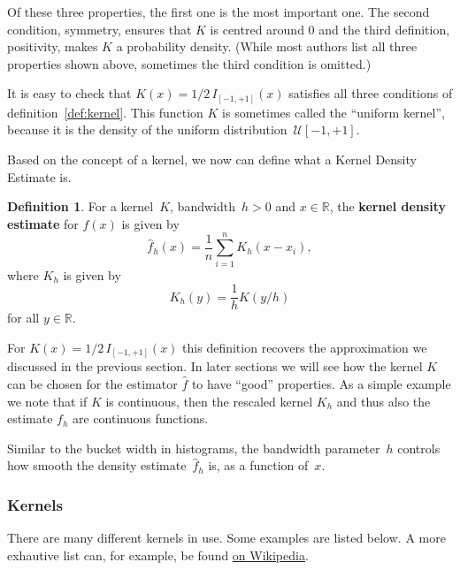 \documentclass[
  a4paper,
]{article}
\theoremstyle{definition}
\newtheorem{definition}{Definition}[section]
\theoremstyle{definition}
\theoremstyle{definition}
\theoremstyle{definition}
\theoremstyle{remark}
\begin{document}
Of these three properties, the first one is the most important one.
The second condition, symmetry, ensures that \(K\) is centred around \(0\)
and the third definition, positivity, makes \(K\) a probability density.
(While most authors list all three properties shown above, sometimes
the third condition is omitted.)

It is easy to check that \(K(x) = 1/2 \, I_{[-1,+1]}(x)\) satisfies all
three conditions of definition~\ref{def:kernel}. This function \(K\)
is sometimes called the ``uniform kernel'', because it is the density
of the uniform distribution~\(\mathcal{U}[-1,+1]\).

Based on the concept of a kernel, we now can define
what a Kernel Density Estimate is.

\begin{definition}
\protect\hypertarget{def:KDE}{}\label{def:KDE}For a kernel~\(K\), bandwidth~\(h > 0\) and \(x \in \mathbb{R}\), the
\textbf{kernel density estimate} for \(f(x)\) is given by
\begin{equation*}
  \hat f_h(x)
  = \frac{1}{n} \sum_{i=1}^n K_h(x - x_i),
\end{equation*}
where \(K_h\) is given by
\begin{equation*}
  K_h(y)
  = \frac{1}{h} K(y/h)
\end{equation*}
for all \(y\in \mathbb{R}\).
\end{definition}

For \(K(x) = 1/2 \, I_{[-1,+1]}(x)\) this definition recovers the
approximation we discussed in the previous section. In later sections
we will see how the kernel \(K\) can be chosen for the estimator \(\hat
f\) to have ``good'' properties. As a simple example we note that if \(K\)
is continuous, then the rescaled kernel \(K_h\) and thus also the
estimate \(f_h\) are continuous functions.

Similar to the bucket width in histograms, the bandwidth parameter~\(h\)
controls how smooth the density estimate~\(\hat f_h\) is, as a function
of~\(x\).

\subsubsection{Kernels}\label{kernels}

There are many different kernels in use. Some examples are listed
below. A more exhautive list can, for example, be found
\href{https://en.wikipedia.org/wiki/Kernel_(statistics)\#Kernel_functions_in_common_use}{on Wikipedia}.
\end{document}
